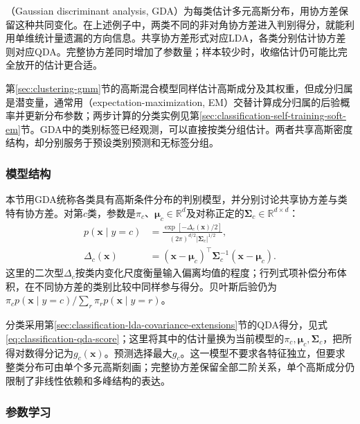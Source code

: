 （Gaussian discriminant analysis, GDA）为每类估计多元高斯分布，用协方差保留这种共同变化。在上述例子中，两类不同的非对角协方差进入判别得分，就能利用单维统计量遗漏的方向信息。共享协方差形式对应LDA，各类分别估计协方差则对应QDA。完整协方差同时增加了参数量；样本较少时，收缩估计仍可能比完全放开的估计更合适。

第\ref{sec:clustering-gmm}节的高斯混合模型同样估计高斯成分及其权重，但成分归属是潜变量，通常用（expectation-maximization, EM）交替计算成分归属的后验概率并更新分布参数；两步计算的分类实例见第\ref{sec:classification-self-training-soft-em}节。GDA中的类别标签已经观测，可以直接按类分组估计。两者共享高斯密度结构，却分别服务于预设类别预测和无标签分组。

\subsubsection{模型结构}
\label{sec:classification-gda-structure}

本节用GDA统称各类具有高斯条件分布的判别模型，并分别讨论共享协方差与类特有协方差。对第$c$类，参数是$\pi_c$、$\bm{\mu}_c\in\mathbb{R}^{d}$及对称正定的$\bm{\Sigma}_c\in\mathbb{R}^{d\times d}$：
\begin{equation}
  \label{eq:classification-gda-density}
  \begin{aligned}
    p(\bm{x}\mid y=c)
      &=\frac{\exp[-\Delta_c(\bm{x})/2]}
        {(2\pi)^{d/2}|\bm{\Sigma}_c|^{1/2}},\\
    \Delta_c(\bm{x})
      &=(\bm{x}-\bm{\mu}_c)^{\top}
        \bm{\Sigma}_c^{-1}(\bm{x}-\bm{\mu}_c).
  \end{aligned}
\end{equation}
这里的二次型$\Delta_c$按类内变化尺度衡量输入偏离均值的程度；行列式项补偿分布体积，在不同协方差的类别比较中同样参与得分。贝叶斯后验仍为$\pi_cp(\bm{x}\mid y=c)/\sum_r\pi_rp(\bm{x}\mid y=r)$。

分类采用第\ref{sec:classification-lda-covariance-extensions}节的QDA得分，见式\eqref{eq:classification-qda-score}；这里将其中的估计量换为当前模型的$\pi_c,\bm\mu_c,\bm\Sigma_c$，把所得对数得分记为$g_c(\bm{x})$。预测选择最大$g_c$。这一模型不要求各特征独立，但要求整类分布可由单个多元高斯刻画；完整协方差保留全部二阶关系，单个高斯成分仍限制了非线性依赖和多峰结构的表达。

\subsubsection{参数学习}
\label{sec:classification-gda-learning}

